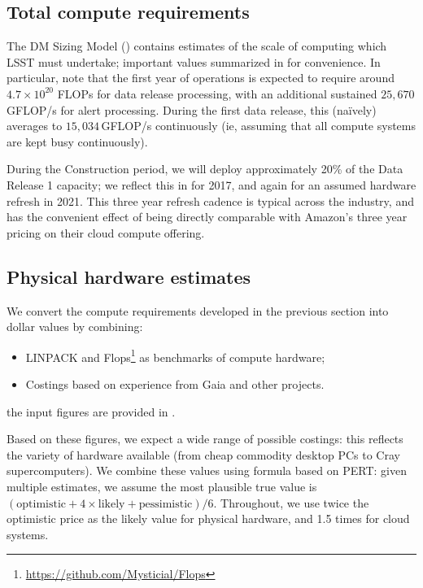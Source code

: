 \newpage
\subsection{Total compute requirements}



The DM Sizing Model () contains estimates of the scale of computing which LSST must undertake; important values summarized in  for convenience. In particular, note that the first year of operations is expected to require around $4.7\times10^{20}$ FLOPs for data release processing, with an additional sustained $25,670$\,GFLOP/s for alert processing. During the first data release, this (na\"ively) averages to $15,034$\,GFLOP/s continuously (ie, assuming that all compute systems are kept busy continuously).

During the Construction period, we will deploy approximately 20\% of the Data Release 1 capacity; we reflect this in  for 2017, and again for an assumed hardware refresh in 2021. This three year refresh cadence is typical across the industry, and has the convenient effect of being directly comparable with Amazon's three year pricing on their cloud compute offering.

\newpage
\subsection{Physical hardware estimates}



We convert the compute requirements developed in the previous section into dollar values by combining:

\begin{itemize}

  \item{LINPACK and Flops\footnote {\url{https://github.com/Mysticial/Flops}} as benchmarks of  compute hardware;}
  \item{Costings based on experience from Gaia and other projects.}

\end{itemize}
the input figures are provided in .


Based on these figures, we expect a wide range of possible costings: this reflects the variety of hardware available (from cheap commodity desktop PCs to Cray supercomputers).
We combine these values using formula based on PERT: given multiple estimates, we assume the most plausible true value is
$(\mathrm{optimistic}  + 4\times\mathrm{likely} + \mathrm{pessimistic})/6$. Throughout, we use twice the optimistic price as the likely value for physical hardware, and 1.5 times for cloud systems.

